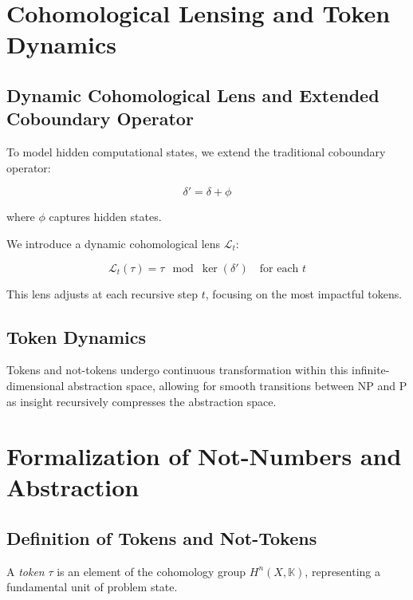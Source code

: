 \documentclass{article}
\begin{document}
\section{Cohomological Lensing and Token Dynamics}

\subsection{Dynamic Cohomological Lens and Extended Coboundary Operator}

To model hidden computational states, we extend the traditional coboundary operator:

\begin{equation}
\delta' = \delta + \phi
\end{equation}

where \( \phi \) captures hidden states.

We introduce a dynamic cohomological lens \( \mathcal{L}_t \):

\begin{equation}
\mathcal{L}_t(\tau) = \tau \mod \ker(\delta') \quad \text{for each } t
\end{equation}

This lens adjusts at each recursive step \( t \), focusing on the most impactful tokens.

\subsection{Token Dynamics}

Tokens and not-tokens undergo continuous transformation within this infinite-dimensional abstraction space, allowing for smooth transitions between NP and P as insight recursively compresses the abstraction space.

\section{Formalization of Not-Numbers and Abstraction}

\subsection{Definition of Tokens and Not-Tokens}

\begin{definition}
A \textit{token} \( \tau \) is an element of the cohomology group \( H^n(X, \mathbb{K}) \), representing a fundamental unit of problem state.
\end{definition}
\end{document}

